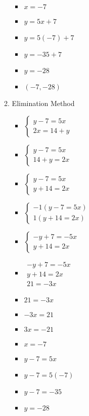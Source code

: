 \documentclass{article}
\begin{document}
\begin{enumerate}
\begin{enumerate}
\begin{itemize}
    \item $x=-7$
    \item $y=5x+7$
    \item $y=5(-7)+7$
    \item $y=-35+7$
    \item $y=-28$
    \item $(-7,-28)$
    \end{itemize}
  \item Elimination Method
    \begin{itemize}
    \item $\left\{ \begin{array}{l}
          y-7=5x \\
          2x=14+y \end{array} \right.$
    \item $\left\{ \begin{array}{l}
          y-7=5x \\
          14+y=2x \end{array} \right.$
    \item $\left\{ \begin{array}{l}
          y-7=5x \\
          y+14=2x \end{array} \right.$
    \item $\left\{ \begin{array}{l}
          -1(y-7=5x) \\
          1(y+14=2x) \end{array} \right.$
    \item $\left\{ \begin{array}{l}
          -y+7=-5x \\
          y+14=2x \end{array} \right.$
    \item $\begin{array}{l}
          -y+7=-5x \\
          y+14=2x \\ \hline 
          21=-3x\end{array}$
    \item $21=-3x$
    \item $-3x=21$
    \item $3x=-21$
    \item $x=-7$
    \item $y-7=5x$
    \item $y-7=5(-7)$
    \item $y-7=-35$
    \item $y=-28$

\end{itemize}
\end{enumerate}
\end{enumerate}
\end{document}
